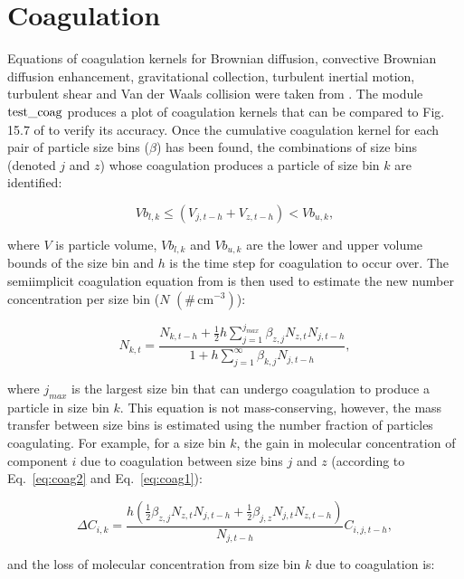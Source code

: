 \documentclass[gmd, manuscript]{copernicus}
\begin{document}
\section{Coagulation}

Equations of coagulation kernels for Brownian diffusion, convective Brownian diffusion enhancement, gravitational collection, turbulent inertial motion, turbulent shear and Van der Waals collision were taken from \citet{Jacobson2005}.  The module $\rm{test\_coag}$ produces a plot of coagulation kernels that can be compared to Fig. 15.7 of \citet{Jacobson2005} to verify its accuracy.  Once the cumulative coagulation kernel for each pair of particle size bins ($\beta$) has been found, the combinations of size bins (denoted $j$ and $z$) whose coagulation produces a particle of size bin $k$ are identified:

 \begin{equation} \label{eq:coag2}
Vb_{l,k} \leq (V_{j,t-h}+V_{z,t-h}) < Vb_{u,k},
\end{equation}

where $V$ is particle volume, $Vb_{l,k}$ and $Vb_{u,k}$ are the lower and upper volume bounds of the size bin and $h$ is the time step for coagulation to occur over.  The semiimplicit coagulation equation from \citet{Jacobson2005} is then used to estimate the new number concentration per size bin ($N$ $(\#\, \mathrm{cm^{-3}})$):

\begin{equation} \label{eq:coag1}
N_{k,t} = \frac{N_{k,t-h}+\frac{1}{2}h\sum_{j=1}^{j_{max}}\beta_{z,j}N_{z,t}N_{j,t-h}}{1+h\sum_{j=1}^{\infty}\beta_{k,j}N_{j,t-h}},
\end{equation}

where $j_{max}$ is the largest size bin that can undergo coagulation to produce a particle in size bin $k$.  This equation is not mass-conserving, however, the mass transfer between size bins is estimated using the number fraction of particles coagulating.  For example, for a size bin $k$, the gain in molecular concentration of component $i$ due to coagulation between size bins $j$ and $z$ (according to Eq.~\ref{eq:coag2} and Eq.~\ref{eq:coag1}):

\begin{equation} \label{eq:coag3}
\Delta C_{i,k} = \frac{h(\frac{1}{2}\beta_{z,j}N_{z,t}N_{j,t-h}+\frac{1}{2}\beta_{j,z}N_{j,t}N_{z,t-h})}{N_{j,t-h}}C_{i,j,t-h},
\end{equation}

and the loss of molecular concentration from size bin $k$ due to coagulation is:
\end{document}
